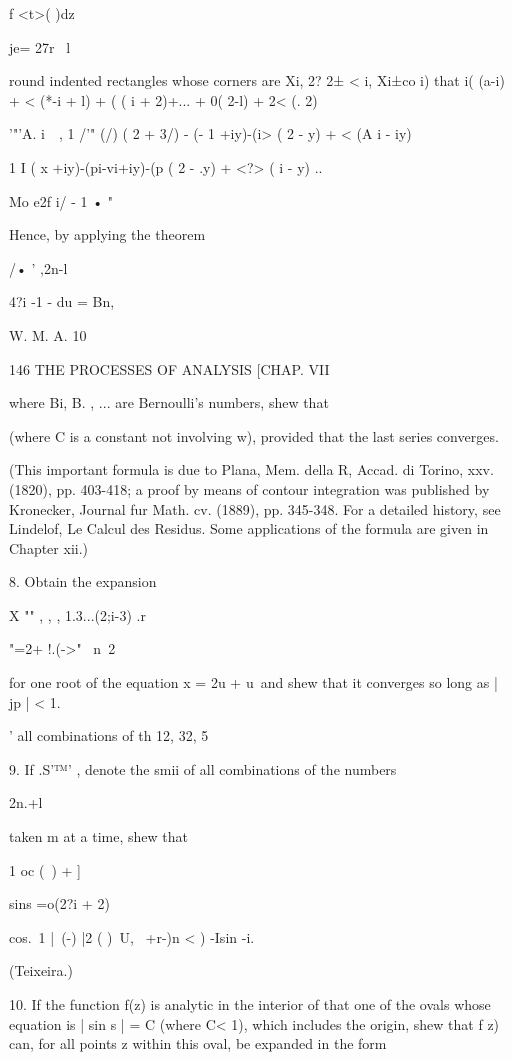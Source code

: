 {{f <t>( )dz

je= 27r \ l

round indented rectangles whose corners are Xi, 2? 2± < i, Xi±co i)
that i( (a-i) + < (*-i + l) + ( ( i + 2)+... + 0( 2-l) + 2< (. 2)

'"'A. i~\ , 1 /'" (/) ( 2 + 3/) - (- 1 +iy)-(i> ( 2 - y) + < (A i -
iy)

1 I ( x +iy)-(pi-vi+iy)-(p ( 2 - .y) + <?> ( i - y) ..

Mo e2f i/ - 1 • "

Hence, by applying the theorem

/• ' ,2n-l

4?i -1 - du = Bn,

W. M. A. 10

146 THE PROCESSES OF ANALYSIS [CHAP. VII

where Bi, B. , ... are Bernoulli's numbers, shew that

(where C is a constant not involving w), provided that the last series
converges.

(This important formula is due to Plana, Mem. della R, Accad. di
Torino, xxv. (1820), pp. 403-418; a proof by means of contour
integration was published by Kronecker, Journal fur Math. cv. (1889),
pp. 345-348. For a detailed history, see Lindelof, Le Calcul des
Residus. Some applications of the formula are given in Chapter xii.)

8. Obtain the expansion

X "" , , , 1.3...(2;i-3) .r

"=2+ !.(->"~ n\ 2

for one root of the equation x = 2u + u\ and shew that it converges so
long as | jp | < 1.

' all combinations of th 12, 32, 5%

9. If .S'™' , denote the smii of all combinations of the numbers

2n.+l

taken m at a time, shew that

1 oc (\ ) + ]

sins =o(2?i + 2)

cos.\ 1 |\ (-) |2 ( )\ U, \ +r-)n < ) -Isin -i.

(Teixeira.)

10. If the function f(z) is analytic in the interior of that one of
the ovals whose equation is | sin s | = C (where C< 1), which includes
the origin, shew that f z) can, for all points z within this oval, be
expanded in the form

}}
